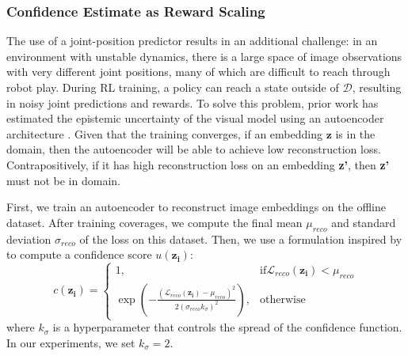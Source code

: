 \subsubsection{Confidence Estimate as Reward Scaling}
\label{subsubsec:conf_scaling}
The use of a joint-position predictor results in an additional challenge: in an environment with unstable dynamics, there is a large space of image observations with very different joint positions, many of which are difficult to reach through robot play. During RL training, a policy can reach a state outside of $\mathcal{D}$, resulting in noisy joint predictions and rewards. To solve this problem, prior work has estimated the epistemic uncertainty of the visual model using an autoencoder architecture \citep{andrews2016autoencoder, frey2023fasttraversabilityestimationwild}. Given that the training converges, if an embedding $\mathbf{z}$ is in the domain, then the autoencoder will be able to achieve low reconstruction loss. Contrapositively, if it has high reconstruction loss on an embedding \textbf{z'}, then \textbf{z'} must not be in domain. 

First, we train an autoencoder to reconstruct image embeddings on the offline dataset. After training coverages, we compute the final mean $\mu_{reco}$ and standard deviation $\sigma_{reco}$ of the loss on this dataset. Then, we use a formulation inspired by \citet{frey2023fasttraversabilityestimationwild} to compute a confidence score $u(\mathbf{z_i})$:
\begin{equation}
\label{eq:conf_scaling}
c(\mathbf{z_i}) = 
\begin{cases} 
1, & \text{if} \mathcal{L}_{reco}(\mathbf{z_i}) < \mu_{reco}
\\
 \exp{\left(-\frac{(\mathcal{L}_{reco}(\mathbf{z_i}) - \mu_{reco})^2}{2(\sigma_{reco}k_\sigma)^2}\right)}, & \text{otherwise}
\end{cases}
\end{equation} 
where $k_\sigma$ is a hyperparameter that controls the spread of the confidence function. In our experiments, we set $k_\sigma=2$. 



